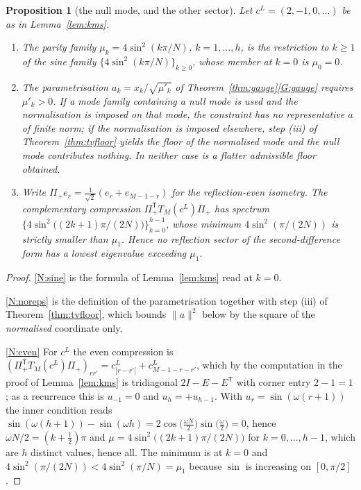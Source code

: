 \documentclass[11pt,a4paper]{article}
\theoremstyle{plain}
\newtheorem{proposition}[theorem]{Proposition}
\theoremstyle{definition}
\newcommand{\T}{\mathsf{T}}
\newcommand{\Tm}[1]{T_{#1}}
\begin{document}
\begin{proposition}[the null mode, and the other sector]
\label{prop:nullmode}
Let $c^{L}=(2,-1,0,\dots)$ be as in Lemma~\ref{lem:kms}.
\begin{enumerate}[label=\textup{(\roman*)},leftmargin=2.6em]
\item\label{N:sine} The parity family $\mu_k=4\sin^{2}(k\pi/N)$,
  $k=1,\dots,h$, is the restriction to $k\ge1$ of the sine family
  $\{4\sin^{2}(k\pi/N)\}_{k\ge0}$, whose member at $k=0$ is $\mu_0=0$.
\item\label{N:noreps} The parametrisation $a_k=x_k/\sqrt{\mu'_k}$ of
  Theorem~\ref{thm:gauge}\ref{G:gauge} requires $\mu'_k>0$. If a mode family
  containing a null mode is used and the normalisation is imposed on that mode,
  the constraint has \emph{no} representative $a$ of finite norm; if the
  normalisation is imposed elsewhere, step (iii) of
  Theorem~\ref{thm:tvfloor} yields the floor of the normalised mode and the
  null mode contributes nothing. In neither case is a flatter admissible floor
  obtained.
\item\label{N:even} Write $\Pi_+e_r=\tfrac1{\sqrt2}(e_r+e_{M-1-r})$ for the
  reflection-even isometry. The complementary compression
  $\Pi_+^{\T}\Tm{M}(c^{L})\Pi_+$ has spectrum
  $\bigl\{4\sin^{2}\bigl((2k+1)\pi/(2N)\bigr)\bigr\}_{k=0}^{h-1}$, whose
  minimum $4\sin^{2}(\pi/(2N))$ is \emph{strictly smaller} than $\mu_1$. Hence
  no reflection sector of the second-difference form has a lowest eigenvalue
  exceeding $\mu_1$.
\end{enumerate}
\end{proposition}

\begin{proof}
\ref{N:sine} is the formula of Lemma~\ref{lem:kms} read at $k=0$.

\ref{N:noreps} is the definition of the parametrisation together with step (iii)
of Theorem~\ref{thm:tvfloor}, which bounds $\lVert a\rVert^{2}$ below by the
square of the \emph{normalised} coordinate only.

\ref{N:even} For $c^{L}$ the even compression is
$(\Pi_+^{\T}\Tm{M}(c^{L})\Pi_+)_{rr'}=c^{L}_{|r-r'|}+c^{L}_{M-1-r-r'}$, which by
the computation in the proof of Lemma~\ref{lem:kms} is tridiagonal
$2I-E-E^{\T}$ with corner entry $2-1=1$; as a recurrence this is $u_{-1}=0$ and
$u_h=+u_{h-1}$. With $u_r=\sin(\omega(r+1))$ the inner condition reads
$\sin(\omega(h+1))-\sin(\omega h)
=2\cos\bigl(\tfrac{\omega N}2\bigr)\sin\bigl(\tfrac\omega2\bigr)=0$, hence
$\omega N/2=(k+\tfrac12)\pi$ and $\mu=4\sin^{2}\bigl((2k+1)\pi/(2N)\bigr)$ for
$k=0,\dots,h-1$, which are $h$ distinct values, hence all. The minimum is at
$k=0$ and $4\sin^{2}(\pi/(2N))<4\sin^{2}(\pi/N)=\mu_1$ because $\sin$ is
increasing on $[0,\pi/2]$.
\end{proof}
\end{document}
